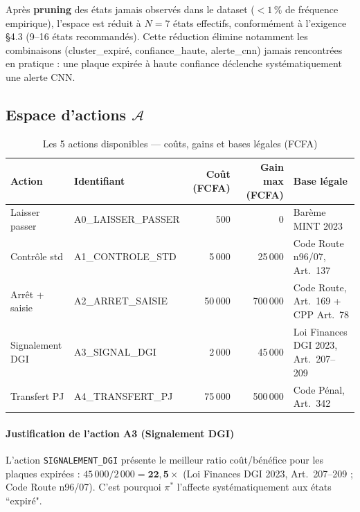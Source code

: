 Apr\`{e}s \textbf{pruning} des \'{e}tats jamais observ\'{e}s dans le dataset
($< 1\,\%$ de fr\'{e}quence empirique), l'espace est r\'{e}duit \`{a}
$N = 7$ \'{e}tats effectifs, conform\'{e}ment \`{a} l'exigence §4.3
(9--16 \'{e}tats recommand\'{e}s). Cette r\'{e}duction \'{e}limine notamment
les combinaisons (cluster\_expir\'{e}, confiance\_haute, alerte\_cnn) jamais
rencontr\'{e}es en pratique : une plaque expir\'{e}e \`{a} haute confiance
d\'{e}clenche syst\'{e}matiquement une alerte CNN.

\subsection{Espace d'actions $\mathcal{A}$}
\label{sec:c:actions}

\begin{table}[H]
\centering
\caption{Les 5 actions disponibles --- co\^{u}ts, gains et bases l\'{e}gales (FCFA)}
\label{tab:c:actions}
\begin{tabular}{llrrp{4.5cm}}
\toprule
\textbf{Action} & \textbf{Identifiant} & \textbf{Co\^{u}t (FCFA)} & \textbf{Gain max (FCFA)} & \textbf{Base l\'{e}gale} \\
\midrule
Laisser passer     & A0\_LAISSER\_PASSER   &        500 &          0 & Bar\`{e}me MINT 2023 \\
Contr\^{o}le std   & A1\_CONTROLE\_STD     &      5\,000 &     25\,000 & Code Route n\textordmasculine{}96/07, Art.~137 \\
Arr\^{e}t + saisie & A2\_ARRET\_SAISIE     &     50\,000 &    700\,000 & Code Route, Art.~169 + CPP Art.~78 \\
Signalement DGI    & A3\_SIGNAL\_DGI       &      2\,000 &     45\,000 & Loi Finances DGI 2023, Art.~207--209 \\
Transfert PJ       & A4\_TRANSFERT\_PJ     &     75\,000 &    500\,000 & Code P\'{e}nal, Art.~342 \\
\bottomrule
\end{tabular}
\end{table}

\paragraph{Justification de l'action A3 (Signalement DGI)}
L'action \texttt{SIGNALEMENT\_DGI} pr\'{e}sente le meilleur ratio
co\^{u}t/b\'{e}n\'{e}fice pour les plaques expir\'{e}es :
$45\,000 / 2\,000 = \mathbf{22{,}5\times}$ (Loi Finances DGI 2023, Art.~207--209 ;
Code Route n\textordmasculine{}96/07). C'est pourquoi $\pi^*$ l'affecte
syst\'{e}matiquement aux \'{e}tats ``expir\'{e}".

